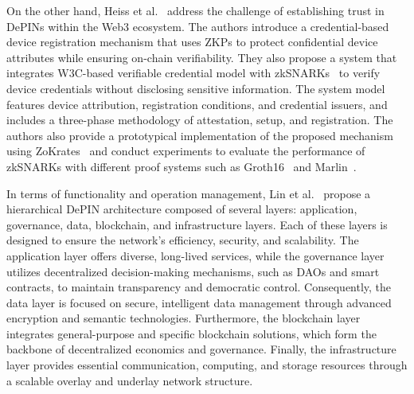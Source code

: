 \documentclass[5p,twocolumn]{elsarticle}
\begin{document}
On the other hand, Heiss et al.~\cite{heiss2024towards} address the challenge of establishing trust in DePINs within the Web3 ecosystem. The authors introduce a credential-based device registration mechanism that uses ZKPs to protect confidential device attributes while ensuring on-chain verifiability. They also propose a system that integrates W3C-based verifiable credential model with zkSNARKs~\cite{nitulescu2020zk} to verify device credentials without disclosing sensitive information. The system model features device attribution, registration conditions, and credential issuers, and includes a three-phase methodology of attestation, setup, and registration. The authors also provide a prototypical implementation of the proposed mechanism using ZoKrates~\cite{eberhardt2018zokrates} and conduct experiments to evaluate the performance of zkSNARKs with different proof systems such as Groth16~\cite{groth2016size} and Marlin~\cite{chiesa2020marlin}.

In terms of functionality and operation management, Lin et al.~\cite{lin2024decentralized} propose a hierarchical DePIN architecture composed of several layers: application, governance, data, blockchain, and infrastructure layers. Each of these layers is designed to ensure the network's efficiency, security, and scalability. The application layer offers diverse, long-lived services, while the governance layer utilizes decentralized decision-making mechanisms, such as DAOs and smart contracts, to maintain transparency and democratic control. Consequently, the data layer is focused on secure, intelligent data management through advanced encryption and semantic technologies. Furthermore, the blockchain layer integrates general-purpose and specific blockchain solutions, which form the backbone of decentralized economics and governance. Finally, the infrastructure layer provides essential communication, computing, and storage resources through a scalable overlay and underlay network structure.
\end{document}
